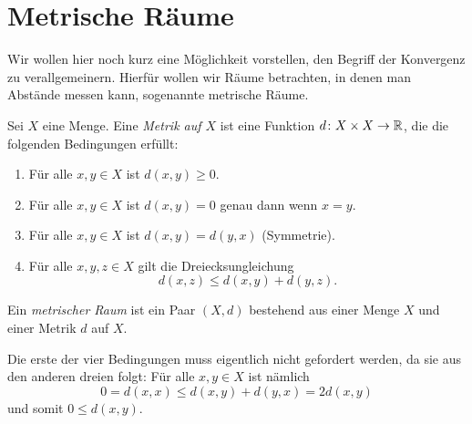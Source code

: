 \documentclass[a4paper,10pt]{article}
\begin{document}
\section{Metrische Räume}
Wir wollen hier noch kurz eine Möglichkeit vorstellen, den Begriff der Konvergenz zu verallgemeinern. Hierfür wollen wir Räume betrachten, in denen man Abstände messen kann, sogenannte metrische Räume.


\begin{defi}
 Sei $X$ eine Menge. Eine \emph{Metrik auf $X$} ist eine Funktion $d \colon X \times X \to \mathbb{R}$, die die folgenden Bedingungen erfüllt:
 \begin{enumerate}
  \item
   Für alle $x,y \in X$ ist $d(x,y) \geq 0$.
  \item
   Für alle $x,y \in X$ ist $d(x,y) = 0$ genau dann wenn $x = y$.
  \item
   Für alle $x,y \in X$ ist $d(x,y) = d(y,x)$ (Symmetrie).
  \item
   Für alle $x,y,z \in X$ gilt die Dreiecksungleichung
   \[
    d(x,z) \leq d(x,y) + d(y,z).
   \]
 \end{enumerate}
 
 Ein \emph{metrischer Raum} ist ein Paar $(X,d)$ bestehend aus einer Menge $X$ und einer Metrik $d$ auf $X$.
\end{defi}


\begin{bem}
 Die erste der vier Bedingungen muss eigentlich nicht gefordert werden, da sie aus den anderen dreien folgt: Für alle $x,y \in X$ ist nämlich
 \[
  0 = d(x,x) \leq d(x,y) + d(y,x) = 2 d(x,y)
 \]
 und somit $0 \leq d(x,y)$.
\end{bem}
\end{document}
